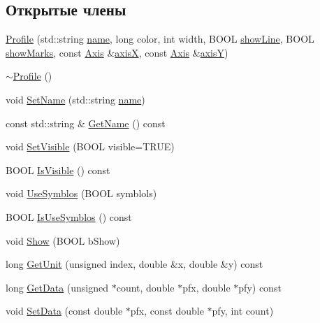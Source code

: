 \subsection*{Открытые члены}
\begin{DoxyCompactItemize}
\item 
\hyperlink{class_profile_a0af304ee61478092d010df5dc146bd06}{Profile} (std\-::string \hyperlink{class_profile_ac8a75db2da9448616fb180edcc25bf8c}{name}, long color, int width, B\-O\-O\-L \hyperlink{class_profile_a7e12899117a7229fd74e727d4c7508aa}{show\-Line}, B\-O\-O\-L \hyperlink{class_profile_a07364e07ee0c925c0b2a7631c666056b}{show\-Marks}, const \hyperlink{class_axis}{Axis} \&\hyperlink{class_profile_a9ab5958c5e36ddb1c8dc96773bfbaeb6}{axis\-X}, const \hyperlink{class_axis}{Axis} \&\hyperlink{class_profile_af934163fd90437181ce2125860214cd0}{axis\-Y})
\item 
\hyperlink{class_profile_a58fa758a59bc4ee3c1a9980e360e4e98}{$\sim$\-Profile} ()
\item 
void \hyperlink{class_profile_af982d6eea235d68ebd74f102ef29d12a}{Set\-Name} (std\-::string \hyperlink{class_profile_ac8a75db2da9448616fb180edcc25bf8c}{name})
\item 
const std\-::string \& \hyperlink{class_profile_aa6baeea130f07d7027117d1663619251}{Get\-Name} () const 
\item 
void \hyperlink{class_profile_a6ae3bac4830d7b81cfc5daefeb406445}{Set\-Visible} (B\-O\-O\-L visible=T\-R\-U\-E)
\item 
B\-O\-O\-L \hyperlink{class_profile_a381fe66a6e251a351c0157587d609ad7}{Is\-Visible} () const 
\item 
void \hyperlink{class_profile_a839300e94f6e588988c5b25e167de9dd}{Use\-Symblos} (B\-O\-O\-L symblols)
\item 
B\-O\-O\-L \hyperlink{class_profile_a431d9a16e08188d7ad014c0d20696237}{Is\-Use\-Symblos} () const 
\item 
void \hyperlink{class_profile_a2f9a7420f40b1cc4974a2fe6b1a2aca8}{Show} (B\-O\-O\-L b\-Show)
\item 
long \hyperlink{class_profile_aacee6e0f579d0dbcc6f8452778907473}{Get\-Unit} (unsigned index, double \&x, double \&y) const 
\item 
long \hyperlink{class_profile_a844b59dcfb67d36f70f322425b7f98ee}{Get\-Data} (unsigned $\ast$count, double $\ast$pfx, double $\ast$pfy) const 
\item 
void \hyperlink{class_profile_aa272424c24ba0eacdd3aa725c6e44e98}{Set\-Data} (const double $\ast$pfx, const double $\ast$pfy, int count)

\end{DoxyCompactItemize}

